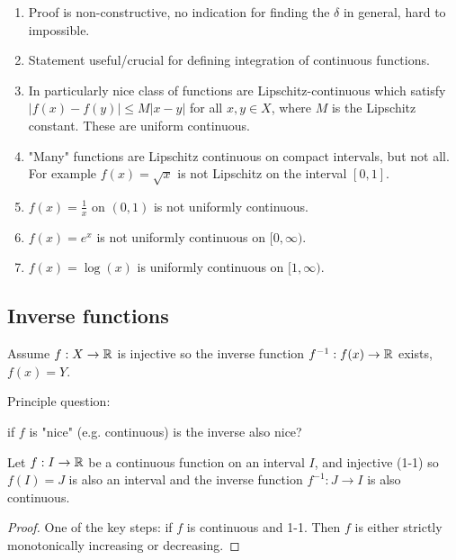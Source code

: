 \documentclass[10pt, a4paper]{article}
\begin{document}
\begin{remark}
    \begin{enumerate}[label = (\roman*)]
        \item Proof is non-constructive,
        no indication for finding the $\delta$ in general,
        hard to impossible.

        \item Statement useful/crucial for defining integration of continuous functions.

        \item In particularly nice class of functions are Lipschitz-continuous which satisfy $|f(x) - f(y)| \leq M|x - y|$ for all $x, y \in X$,
        where $M$ is the Lipschitz constant.
        These are uniform continuous.

        \item "Many" functions are Lipschitz continuous on compact intervals,
        but not all.
        For example $f(x) = \sqrt{x}$ is not Lipschitz on the interval $[0, 1]$.

        \item $f(x) = \frac{1}{x}$ on $(0, 1)$ is not uniformly continuous.

        \item $f(x) = e ^ x$ is not uniformly continuous on $[0, \infty)$.

        \item $f(x) = \log(x)$ is uniformly continuous on $[1, \infty)$.
    \end{enumerate}
\end{remark}

\subsection{Inverse functions}
Assume $f : X \rightarrow \mathbb{R}$ is injective so the inverse function $f ^ {-1} : f(x) \rightarrow \mathbb{R}$ exists,
$f(x) = Y$.

Principle question:

if $f$ is "nice"
(e.g. continuous)
is the inverse also nice?

\begin{theorem}
    Let $f : I \rightarrow \mathbb{R}$ be a continuous function on an interval $I$,
    and injective
    (1-1)
    so $f(I) = J$ is also an interval and the inverse function $f ^ {-1} : J \rightarrow I$ is also continuous.

    \begin{proof}
        One of the key steps:
        if $f$ is continuous and 1-1.
        Then $f$ is either strictly monotonically increasing or decreasing.
    \end{proof}
\end{theorem}
\end{document}
